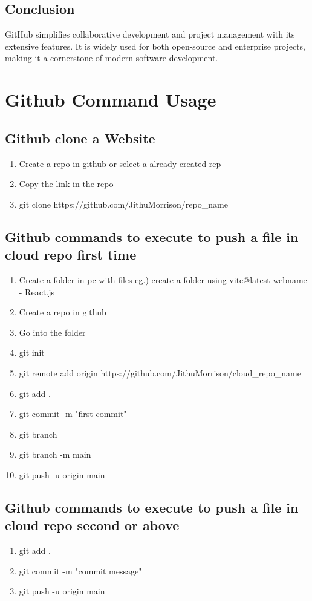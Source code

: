 \documentclass[openany]{book} %
\begin{document}
\section{Conclusion}
GitHub simplifies collaborative development and project management with its extensive features. It is widely used for both open-source and enterprise projects, making it a cornerstone of modern software development.


\chapter{Github Command Usage}
\section{Github clone a Website}
\begin{enumerate}
    \item Create a repo in github or select a already created rep
    \item Copy the link in the repo
    \item git clone https://github.com/JithuMorrison/repo\_name
\end{enumerate}


\section{Github commands to execute to push a file in cloud repo first time}
\begin{enumerate}
    \item Create a folder in pc with files eg.) create a folder using vite@latest webname - React.js
    \item Create a repo in github
    \item Go into the folder 
    \item git init
    \item git remote add origin https://github.com/JithuMorrison/cloud\_repo\_name
    \item git add .
    \item git commit -m "first commit"  
    \item git branch
    \item git branch -m main
    \item git push -u origin main
\end{enumerate}

\section{Github commands to execute to push a file in cloud repo second or above}
\begin{enumerate}
    \item git add .
    \item git commit -m "commit message"
    \item git push -u origin main
\end{enumerate}
\end{document}
